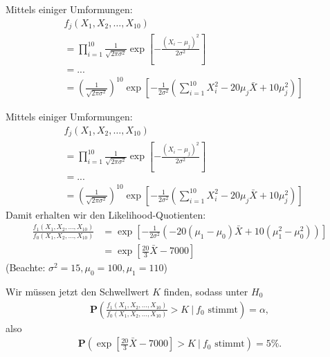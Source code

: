 \documentclass[t,11pt]{beamer}
\begin{document}
\begin{frame}
Mittels einiger Umformungen:
\begin{align*}
&f_j(X_1,X_2,\dots,X_{10})\\&=\prod_{i=1}^{10}\frac{1}{\sqrt{2\pi\sigma^2}}\exp \left[-\frac{(X_i-\mu_j)^2}{2\sigma^2}\right]\\
&= ...\\
&= \left( \frac{1}{\sqrt{2\pi\sigma^2}} \right)^{10}\exp \left[ -\frac{1}{2\sigma^2} \left( \sum_{i=1}^{10} X_i^2 - 20\mu_j\bar{X} + 10\mu_j^2  \right)  \right] 
\end{align*} 
\end{frame}

\begin{frame}
	Mittels einiger Umformungen:
	\begin{align*}
		&f_j(X_1,X_2,\dots,X_{10})\\&=\prod_{i=1}^{10}\frac{1}{\sqrt{2\pi\sigma^2}}\exp \left[-\frac{(X_i-\mu_j)^2}{2\sigma^2}\right]\\
		&= ...\\
		&= \left( \frac{1}{\sqrt{2\pi\sigma^2}} \right)^{10}\exp \left[ -\frac{1}{2\sigma^2} \left( \sum_{i=1}^{10} X_i^2 - 20\mu_j\bar{X} + 10\mu_j^2  \right)  \right] 
	\end{align*} 
	Damit erhalten wir den Likelihood-Quotienten: 
	\begin{align*}
		\frac{f_1(X_1,X_2,\dots,X_{10})}{f_0(X_1,X_2,\dots,X_{10})}&=\exp \left[ - \frac{1}{2\sigma^2} \left( -20(\mu_1-\mu_0)\bar{X}+10(\mu_1^2-\mu_0^2)  \right)  \right] \\
		&= \exp \left[ \frac{20}{3}\bar{X}-7000  \right]
	\end{align*}
	(Beachte: $\sigma^2=15,\mu_0=100,\mu_1=110$)
\end{frame}

\begin{frame}
Wir müssen jetzt den Schwellwert $K$ finden, sodass unter $H_0$
\begin{align*}
\mathbf{P}\left(\frac{f_1(X_1,X_2,\dots,X_{10})}{f_0(X_1,X_2,\dots,X_{10})}>K~\bigg\vert~ f_0\text{ stimmt}\right)=\alpha, 
\end{align*}
also
\begin{align*}
\mathbf{P}\left(\exp \left[ \frac{20}{3}\bar{X}-7000  \right]>K~\bigg\vert~ f_0\text{ stimmt}\right)=5\%.
\end{align*}
\end{frame}
\end{document}
